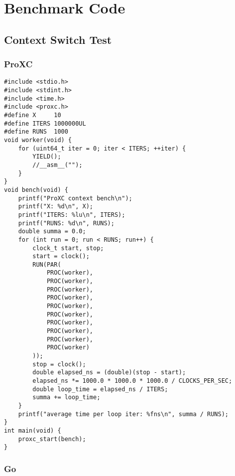
\chapter{Benchmark Code}
\label{ch:benchmark_code}

\section*{Context Switch Test}

\subsection*{ProXC}

\begin{lstlisting}[caption={Context switch code for ProXC},style={CustomC}]
#include <stdio.h>
#include <stdint.h>
#include <time.h>
#include <proxc.h>
#define X     10
#define ITERS 1000000UL
#define RUNS  1000
void worker(void) {
    for (uint64_t iter = 0; iter < ITERS; ++iter) {
        YIELD();
        //__asm__("");
    }
}
void bench(void) {
    printf("ProXC context bench\n");
    printf("X: %d\n", X);
    printf("ITERS: %lu\n", ITERS);
    printf("RUNS: %d\n", RUNS);
    double summa = 0.0;
    for (int run = 0; run < RUNS; run++) {
        clock_t start, stop;
        start = clock();
        RUN(PAR(
            PROC(worker), 
            PROC(worker), 
            PROC(worker), 
            PROC(worker), 
            PROC(worker), 
            PROC(worker), 
            PROC(worker), 
            PROC(worker), 
            PROC(worker), 
            PROC(worker)
        ));
        stop = clock();
        double elapsed_ns = (double)(stop - start);
        elapsed_ns *= 1000.0 * 1000.0 * 1000.0 / CLOCKS_PER_SEC;
        double loop_time = elapsed_ns / ITERS;
        summa += loop_time;
    }
    printf("average time per loop iter: %fns\n", summa / RUNS);
}
int main(void) {
    proxc_start(bench);
}
\end{lstlisting}

\subsection*{Go}

